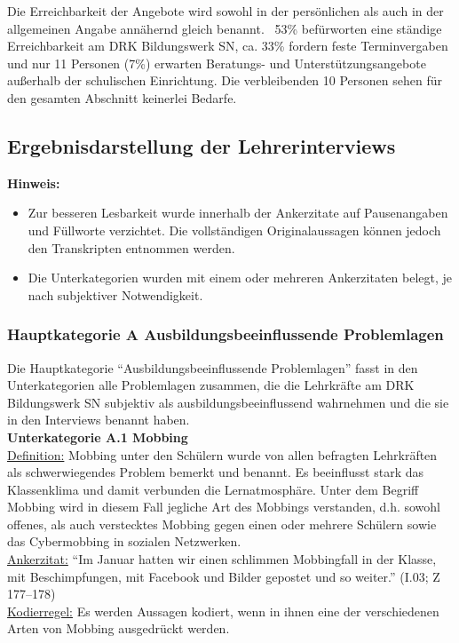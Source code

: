 \noindent
Die Erreichbarkeit der Angebote wird sowohl in der persönlichen als auch in der allgemeinen Angabe annähernd gleich benannt. ~53\% befürworten eine ständige Erreichbarkeit am DRK Bildungswerk SN, ca. 33\% fordern feste Terminvergaben und nur 11 Personen (7\%) erwarten Beratungs- und Unterstützungsangebote außerhalb der schulischen Einrichtung. Die verbleibenden 10 Personen sehen für den gesamten Abschnitt keinerlei Bedarfe.

\newpage
\subsection{Ergebnisdarstellung der Lehrerinterviews}
\label{sec:ErgebnisdarstellungDerLehrerinterviews}

\textbf{Hinweis:} 
\begin{itemize}
	\item Zur besseren Lesbarkeit wurde innerhalb der Ankerzitate auf Pausenangaben und Füllworte verzichtet. Die vollständigen Originalaussagen können jedoch den Transkripten entnommen werden.
	\item Die Unterkategorien wurden mit einem oder mehreren Ankerzitaten belegt, je nach subjektiver Notwendigkeit.
\end{itemize}


\subsubsection{Hauptkategorie A Ausbildungsbeeinflussende Problemlagen}
\label{sec:HauptkategorieAAusbildungsbeeinflussendeProblemlagen}

Die Hauptkategorie "`Ausbildungsbeeinflussende Problemlagen"' fasst in den Unterkategorien alle Problemlagen zusammen, die die Lehrkräfte am DRK Bildungswerk SN subjektiv als ausbildungsbeeinflussend wahrnehmen und die sie in den Interviews benannt haben.\\

\textbf{Unterkategorie A.1 Mobbing}\\
\underline{Definition:} Mobbing unter den Schülern wurde von allen befragten Lehrkräften als schwerwiegendes Problem bemerkt und benannt. Es beeinflusst stark das Klassenklima und damit verbunden die Lernatmosphäre. Unter dem Begriff Mobbing wird in diesem Fall jegliche Art des Mobbings verstanden, d.h. sowohl offenes, als auch verstecktes Mobbing gegen einen oder mehrere Schülern sowie das Cybermobbing in sozialen Netzwerken.\\
\underline{Ankerzitat:} "`Im Januar hatten wir einen schlimmen Mobbingfall in der Klasse, mit Beschimpfungen, mit Facebook und Bilder gepostet und so weiter."' (I.03; Z 177--178)\\
\underline{Kodierregel:} Es werden Aussagen kodiert, wenn in ihnen eine der verschiedenen Arten von Mobbing ausgedrückt werden.\\

